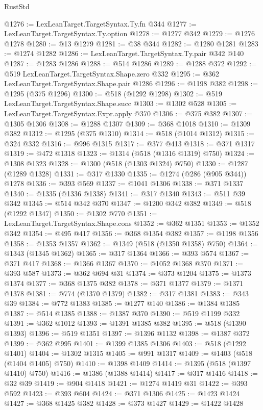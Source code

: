 \begin{lexlean}{RustStd}
\begin{coremodule}
@1276 := LexLeanTarget.TargetSyntax.Ty.fn @344
@1277 := LexLeanTarget.TargetSyntax.Ty.option
@1278 := @1277 @342
@1279 := @1276 @1278
@1280 := @13 @1279
@1281 := @38 @344
@1282 := @1280 @1281
@1283 := @1274 @1282
@1286 := LexLeanTarget.TargetSyntax.Ty.pair @342 @140
@1287 := @1283 @1286
@1288 := @514 @1286
@1289 := @1288 @372
@1292 := @519 LexLeanTarget.TargetSyntax.Shape.zero @332
@1295 := @362 LexLeanTarget.TargetSyntax.Shape.pair @1286
@1296 := @1198 @382
@1298 := @1295 (@375 @1296)
@1300 := @518 (@1292 @1298)
@1302 := @519 LexLeanTarget.TargetSyntax.Shape.succ
@1303 := @1302 @528
@1305 := LexLeanTarget.TargetSyntax.Expr.apply @370
@1306 := @375 @382
@1307 := @1305 @1306
@1308 := @1288 @1307
@1309 := @368 @1018
@1310 := @1309 @382
@1312 := @1295 (@375 @1310)
@1314 := @518 (@1014 @1312)
@1315 := @324 @332
@1316 := @996 @1315
@1317 := @377 @413
@1318 := @371 @1317
@1319 := @472 @1318
@1323 := @1314 (@518 (@1316 @1319) @750)
@1324 := @1308 @1323
@1328 := @1300 (@518 (@1303 @1324) @750)
@1330 := @1287 (@1289 @1328)
@1331 := @317 @1330
@1335 := @1274 (@286 (@905 @344)) @1278
@1336 := @393 @569
@1337 := @1041 @1306
@1338 := @371 @1337
@1340 := @1335 (@1336 @1338)
@1341 := @317 @1340
@1343 := @511 @39 @342
@1345 := @514 @342 @370
@1347 := @1200 @342 @382
@1349 := @518 (@1292 @1347)
@1350 := @1302 @770
@1351 := LexLeanTarget.TargetSyntax.Shape.cons
@1352 := @362 @1351
@1353 := @1352 @342
@1354 := @495 @417
@1356 := @368 @1354 @382
@1357 := @1198 @1356
@1358 := @1353 @1357
@1362 := @1349 (@518 (@1350 @1358) @750)
@1364 := @1343 (@1345 @1362)
@1365 := @317 @1364
@1366 := @393 @574
@1367 := @371 @417
@1368 := @1366 @1367
@1370 := @1052 @1368 @370
@1371 := @393 @587
@1373 := @362 @694 @31
@1374 := @373 @1204
@1375 := @1373 @1374
@1377 := @368 @1375 @382
@1378 := @371 @1377
@1379 := @1371 @1378
@1381 := @774 (@1370 @1379)
@1382 := @317 @1381
@1383 := @343 @39
@1384 := @772 @1383
@1385 := @1277 @140
@1386 := @1384 @1385
@1387 := @514 @1385
@1388 := @1387 @370
@1390 := @519 @1199 @332
@1391 := @362 @1012
@1393 := @1391 @1385 @382
@1395 := @518 (@1390 @1393)
@1396 := @519 @1351
@1397 := @1396 @1132
@1398 := @1387 @372
@1399 := @362 @995
@1401 := @1399 @1385 @1306
@1403 := @518 (@1292 @1401)
@1404 := @1302 @1315
@1405 := @991 @1317
@1409 := @1403 (@518 (@1404 @1405) @750)
@1410 := @1398 @1409
@1414 := @1395 (@518 (@1397 @1410) @750)
@1416 := @1386 (@1388 @1414)
@1417 := @317 @1416
@1418 := @32 @39
@1419 := @904 @1418
@1421 := @1274 @1419 @31
@1422 := @393 @592
@1423 := @393 @604
@1424 := @371 @1306
@1425 := @1423 @1424
@1427 := @368 @1425 @382
@1428 := @373 @1427
@1429 := @1422 @1428

\end{coremodule}
\end{lexlean}
